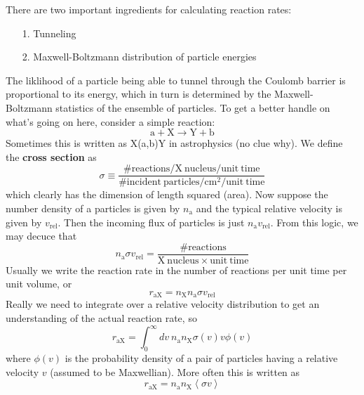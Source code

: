 \documentclass[10pt]{article}
\numberwithin{equation}{section}
\newcommand{\n}{\noindent}
\newcommand{\avg}[1]{\left\langle#1\right\rangle}
\begin{document}
  \n There are two important ingredients for calculating reaction
  rates:
  \begin{enumerate}
  \item[1.] Tunneling
  \item[2.] Maxwell-Boltzmann distribution of particle energies
  \end{enumerate}
  The liklihood of a particle being able to tunnel through the Coulomb
  barrier is proportional to its energy, which in turn is determined
  by the Maxwell-Boltzmann statistics of the ensemble of particles. To
  get a better handle on what's going on here, consider a simple
  reaction:
  \begin{equation}
    \label{eq:102}
    \mathrm{a+X\to Y+b}
  \end{equation}
  Sometimes this is written as X(a,b)Y in astrophysics (no clue
  why). We define the \textbf{cross section} as 
  \begin{equation}
    \label{eq:103}
    \sigma \equiv \frac{\mathrm{\# reactions/X\ nucleus/unit\
        time}}{\mathrm{\#incident\ particles/cm^2/unit\ time}}
  \end{equation}
  which clearly has the dimension of length squared (area). Now
  suppose the number density of a particles is given by $n_\mathrm{a}$
  and the typical relative velocity is given by
  $v_{\mathrm{rel}}$. Then the incoming flux of particles is just
  $n_\mathrm{a}v_{\mathrm{rel}}$. From this logic, we may decuce that
  \begin{equation}
    \label{eq:104}
    n_\mathrm{a}\sigma
    v_{\mathrm{rel}}=\frac{\mathrm{\#reactions}}{\mathrm{X\ nucleus\times
        unit\ time}}
  \end{equation}
  Usually we write the reaction rate in the number of reactions per
  unit time per unit volume, or
  \begin{equation}
    \label{eq:105}
    r_{\mathrm{aX}}=n_\mathrm{X}n_{\mathrm{a}}\sigma v_{\mathrm{rel}}
  \end{equation}
  Really we need to integrate over a relative velocity distribution to
  get an understanding of the actual reaction rate, so
  \begin{equation}
    \label{eq:106}
    r_{\mathrm{aX}}=\int_0^\infty dv\
    n_\mathrm{a}n_{\mathrm{X}}\sigma(v)v\phi(v)
  \end{equation}
  where $\phi(v)$ is the probability density of a pair of particles
  having a relative velocity $v$ (assumed to be Maxwellian). More
  often this is written as
  \begin{equation}
    \label{eq:107}
    r_{\mathrm{aX}}=n_\mathrm{a}n_{\mathrm{X}}\avg{\sigma v}
  \end{equation}
\end{document}
